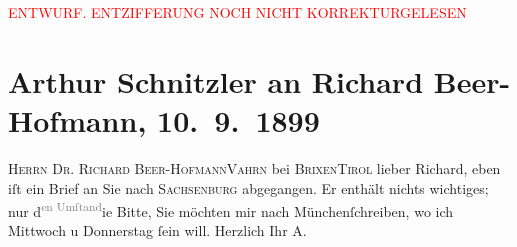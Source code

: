 
\begin{center}
            \textcolor{red}{ENTWURF. ENTZIFFERUNG NOCH NICHT KORREKTURGELESEN}
                      \end{center}
            
               \section[Arthur Schnitzler an Richard Beer-Hofmann, 10. 9. 1899]{ Arthur Schnitzler an Richard Beer-Hofmann, 10. 9. 1899}\nopagebreak{}\rehead{ }\begin{ledgroupsized}[t]{13cm}\normalsize\beginnumbering{} \toendnotes[C]{\smallbreak\pagebreak[2]} 
\pstart{}{\pb}\textsc{Herrn Dr.
                  Richard Beer-Hofmann}\pend{}\pstart{}\textsc{Vahrn} bei \textsc{Brixen}\pend{}\pstart{}\textsc{Tirol}\pend{}{\bigskip}\pstart
           \noindent{}{\pb}lieber Richard, eben iſt ein
               Brief an Sie nach \textsc{Sachsenburg} abgegangen. Er enthält nichts wichtiges; nur d\substVorne{}\textsuperscript{\textcolor{gray}{en Umſtand}}{\allowbreak}\substDazwischen{}ie Bitte\substHinten{}, Sie möchten mir nach Münchenſchreiben,
               wo ich Mittwoch u Donnerstag{ }ſein will.\pend
           \pstart Herzlich Ihr \spacefill\mbox{A.}\pend{}\endnumbering{}\end{ledgroupsized}  \newcommand{\dateiname}{L00972}\newcommand{\titel}{Arthur Schnitzler an Richard Beer-Hofmann, 10. 9. 1899}\newcommand{\editorInnen}{Martin Anton Müller und Gerd-Hermann Susen}
      